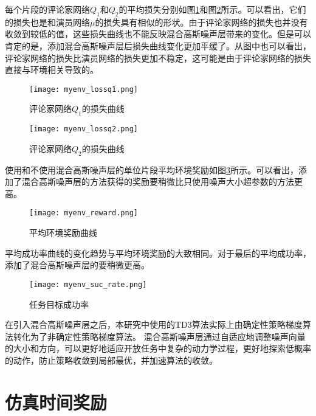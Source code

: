     每个片段的评论家网络$Q_1$和$Q_2$的平均损失分别如图\ref{fcn_lossq1}和图\ref{fcn_lossq2}所示。可以看出，它们的损失也是和演员网络$\mu$的损失具有相似的形状。由于评论家网络的损失也并没有收敛到较低的值，这些损失曲线也不能反映混合高斯噪声层带来的变化。但是可以肯定的是，添加混合高斯噪声层后损失曲线变化更加平缓了。从图中也可以看出，评论家网络的损失比演员网络的损失更加不稳定，这可能是由于评论家网络的损失直接与环境相关导致的。

        \begin{figure}[htpb]
        \centering
        \texttt{[image: myenv\_lossq1.png]}
        \caption{评论家网络$Q_1$的损失曲线}
            \label{fcn_lossq1}
        \end{figure}

        \begin{figure}[htpb]
        \centering
        \texttt{[image: myenv\_lossq2.png]}
        \caption{评论家网络$Q_2$的损失曲线}
            \label{fcn_lossq2}
        \end{figure}

        使用和不使用混合高斯噪声层的单位片段平均环境奖励如图\ref{fcn_reward}所示。可以看出，添加了混合高斯噪声层的方法获得的奖励要稍微比只使用噪声大小超参数的方法更高。

        \begin{figure}[htpb]
        \centering
        \texttt{[image: myenv\_reward.png]}
        \caption{平均环境奖励曲线}
            \label{fcn_reward}
        \end{figure}

        平均成功率曲线的变化趋势与平均环境奖励的大致相同。对于最后的平均成功率，添加了混合高斯噪声层的要稍微更高。

        \begin{figure}[htpb]
        \centering
        \texttt{[image: myenv\_suc\_rate.png]}
        \caption{任务目标成功率}
            \label{fcn_suc_rate}
        \end{figure}

        在引入混合高斯噪声层之后，本研究中使用的TD3算法实际上由确定性策略梯度算法转化为了非确定性策略梯度算法。
        混合高斯噪声层通过自适应地调整噪声向量的大小和方向，可以更好地适应开放任务中复杂的动力学过程，更好地探索低概率的动作，防止策略收敛到局部最优，并加速算法的收敛。


\section{仿真时间奖励}

